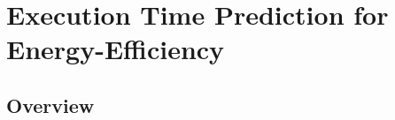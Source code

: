 \section{Execution Time Prediction for Energy-Efficiency}
\label{sec:prediction}

\subsection{Overview}
\label{sec:prediction.overview}


